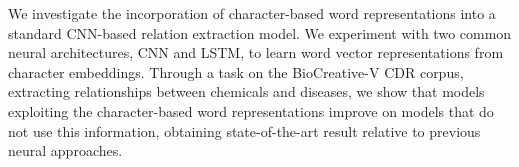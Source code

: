 We investigate the incorporation of character-based word representations into a standard CNN-based relation extraction model. We experiment with two common neural architectures, CNN and LSTM, to learn word vector representations from character embeddings. Through a task on the BioCreative-V CDR corpus, extracting relationships between chemicals and diseases, we show that models exploiting the character-based word representations improve on models that do not use this information, obtaining state-of-the-art result relative to previous neural approaches.

